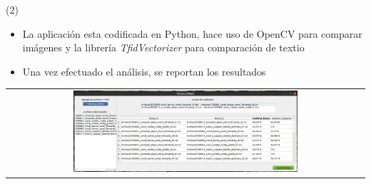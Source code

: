 \begin{frame}{ (2)}
	\begin{itemize}
        \item La aplicación esta codificada en Python, hace uso de OpenCV para comparar imágenes y la librería \textit{TfidVectorizer} para comparación de textio
        \item Una vez efectuado el análisis, se reportan los resultados
	\end{itemize}
\begin{center}
 \begin{tabular}{c}
    \includegraphics[width=0.64\textwidth]{2022_Plagio/figs/analisis.jpg}
  \end{tabular}
\end{center}

\end{frame}





